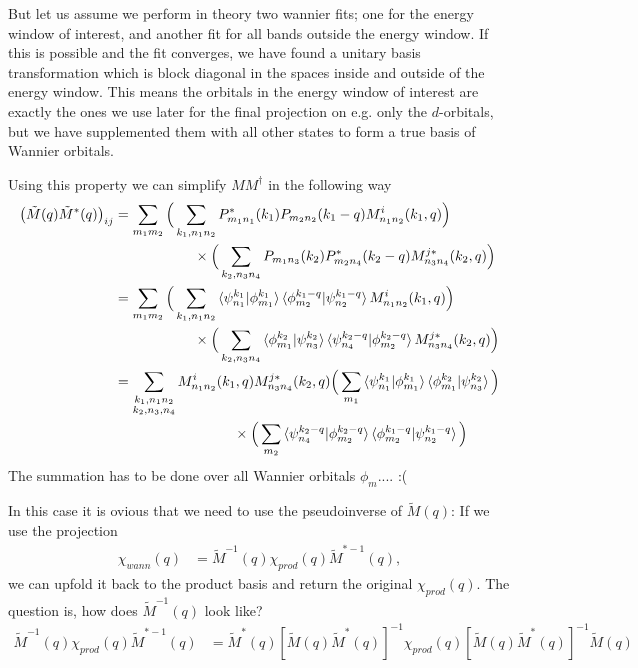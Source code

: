 \documentclass[12pt,a4paper]{scrartcl}
\numberwithin{equation}{section}
\begin{document}
But let us assume we perform in theory two wannier fits; one for the energy window of interest, and 
another fit for all bands outside the energy window. If this is possible and the fit converges, we have 
found a unitary basis transformation which is block diagonal in the spaces inside and outside of the energy 
window. This means the orbitals in the energy window of interest are exactly the ones we use later for 
the final projection on e.g. only the $d$-orbitals, but we have supplemented them with all other states to
form a true basis of Wannier orbitals.

Using this property we can simplify $MM^{\dagger}$ in the following way
\begin{align}
  \left(  \tilde{M}(q) \tilde{M}^{*}(q) \right)_{ij}
 &= \sum_{m_1m_2}\Big( \sum_{k_1,n_1n_2} P^*_{m_1n_1}(k_1) P_{m_2n_2}(k_1-q) M^{i}_{n_1n_2}(k_1,q) \Big) \nonumber \\
 &\hspace{2cm} \times    \Big( \sum_{k_2,n_3n_4} P_{m_1n_3}(k_2) P_{m_2n_4}^*(k_2-q) M^{j*}_{n_3n_4}(k_2,q) \Big) \\
 &= \sum_{m_1m_2}\Big( \sum_{k_1,n_1n_2} \braket{\psi^{k_1}_{n_1}|\phi_{m_1}^{k_1}} \braket{\phi_{m_2}^{k_1-q}|\psi_{n_2}^{k_1-q}} M^{i}_{n_1n_2}(k_1,q) \Big) \nonumber \\
 &\hspace{2cm} \times    \Big( \sum_{k_2,n_3 n_4} \braket{\phi_{m_1}^{k_2}|\psi_{n_3}^{k_2}} \braket{\psi_{n_4}^{k_2-q}|\phi_{m_2}^{k_2-q}}  M^{j*}_{n_3n_4}(k_2,q) \Big) \\
 &= \sum_{\substack{k_1,n_1n_2 \\ k_2,n_3, n_4}}  M^{i}_{n_1n_2}(k_1,q) M^{j*}_{n_3n_4}(k_2,q)
 \Big( \sum_{m_1} \braket{\psi^{k_1}_{n_1}|\phi_{m_1}^{k_1}} \braket{\phi_{m_1}^{k_2}|\psi_{n_3}^{k_2}} \Big) \nonumber \\
 &\hspace{3cm} \times    \Big( \sum_{m_2} \braket{\psi_{n_4}^{k_2-q}|\phi_{m_2}^{k_2-q}}\braket{\phi_{m_2}^{k_1-q}|\psi_{n_2}^{k_1-q}}    \Big) 
\end{align}
The summation has to be done over all Wannier orbitals $\phi_m$.... :(
 
\clearpage


In this case it is ovious that we need to use the pseudoinverse of $\tilde{M}(q)$:
If we use the projection
\begin{align}
 \chi_{wann}(q) 
 &= \tilde{M}^{-1}(q) \chi_{prod}(q) \tilde{M}^{*-1}(q) ,
\end{align}
we can upfold it back to the product basis and return the original $\chi_{prod}(q)$.
The question is, how does $\tilde{M}^{-1}(q)$ look like?
\begin{align}
 \tilde{M}^{-1}(q) \chi_{prod}(q) \tilde{M}^{*-1}(q) 
 &= \tilde{M}^{*}(q) [  \tilde{M}(q) \tilde{M}^{*}(q) ]^{-1} \chi_{prod}(q)
         [  \tilde{M}(q) \tilde{M}^{*}(q) ]^{-1} \tilde{M}(q)
\end{align}
\end{document}
